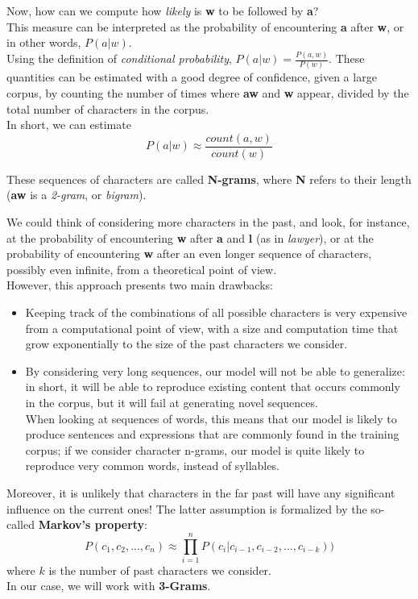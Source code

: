\documentclass[
12pt,
a4paper,
oneside,
headinclude,
footinclude]{article}
\theoremstyle{definition} %
\begin{document}
Now, how can we compute how \textit{likely} is \textbf{w} to be followed by \textbf{a}?\\
This measure can be interpreted as the probability of encountering \textbf{a} after \textbf{w}, or in other words, $P(a | w)$.\\
Using the definition of \textit{conditional probability}, $P(a | w) = \frac{P(a, w)}{P(w)}$.
These quantities can be estimated with a good degree of confidence, given a large corpus, by counting the number of times where \textbf{aw} and \textbf{w} appear, divided by the total number of characters in the corpus.\\
In short, we can estimate $$P(a | w) \approx \frac{count(a, w)}{count(w)}$$ 

These sequences of characters are called \textbf{N-grams}, where \textbf{N} refers to their length (\textbf{aw} is a \textit{2-gram}, or \textit{bigram}).

We could think of considering more characters in the past, and look, for instance, at the probability of encountering \textbf{w} after \textbf{a} and \textbf{l} (as in \textit{lawyer}), or at the probability of encountering \textbf{w} after an even longer sequence of characters, possibly even infinite, from a theoretical point of view.\\
However, this approach presents two main drawbacks:
\begin{itemize}
    \item Keeping track of the combinations of all possible characters is very expensive from a computational point of view, with a size and computation time that grow exponentially to the size of the past characters we consider.
    \item By considering very long sequences, our model will not be able to generalize: in short, it will be able to reproduce existing content that occurs commonly in the corpus, but it will fail at generating novel sequences. \\
    When looking at sequences of words, this means that our model is likely to produce sentences and expressions that are commonly found in the training corpus; if we consider character n-grams, our model is quite likely to reproduce very common words, instead of syllables.\\
\end{itemize}

Moreover, it is unlikely that characters in the far past will have any significant influence on the current ones!
The latter assumption is formalized by the so-called \textbf{Markov's property}: $$P(c_1, c_2, ..., c_n) \approx \prod_{i=1}^{n}{P(c_i|c_{i-1}, c_{i-2}, ..., c_{i-k})})$$
where $k$ is the number of past characters we consider.\\
In our case, we will work with \textbf{3-Grams}.
\end{document}

